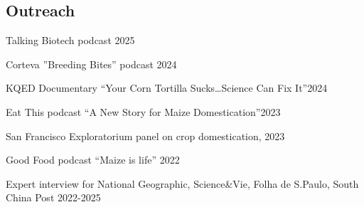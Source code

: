 \documentclass[letterpaper,10pt]{article}
\newcommand{\ignore}[1]{}
\renewenvironment{itemize}{
  \begin{list}{}{
    \setlength{\leftmargin}{1.5em}
  }
}{
  \end{list}
}
\begin{document}
\subsection*{Outreach}
\begin{itemize}
  \setlength\itemsep{0ex}
\item Talking Biotech podcast \hfill 2025
\item Corteva ''Breeding Bites'' podcast \hfill 2024
\item KQED Documentary ``Your Corn Tortilla Sucks…Science Can Fix It''\hfill 2024
\item Eat This podcast ``A New Story for Maize Domestication''\hfill 2023
\item San Francisco Exploratorium panel on crop domestication, \hfill 2023
\item Good Food podcast ``Maize is life'' \hfill 2022
\item Expert interview for \ignore{2024} National Geographic, \ignore{2023} Science\&Vie, \ignore{2023} Folha de S.Paulo, \newline \ignore{2023} South China Post \hfill 2022-2025
\end{itemize}
\end{document}
